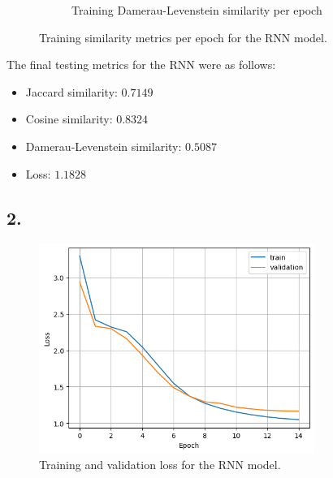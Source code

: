 \documentclass[11pt]{article}
\begin{document}
\begin{figure}[H]
\begin{subfigure}{.5\textwidth}
  \caption{Training Damerau-Levenstein similarity per epoch}
\end{subfigure}
\caption{Training similarity metrics per epoch for the RNN model.}
\label{fig:recurrent_similarity_per_epoch}
\end{figure}
The final testing metrics for the RNN were as follows:
\begin{itemize}
    \item Jaccard similarity: $0.7149$
    \item Cosine similarity: $0.8324$
    \item Damerau-Levenstein similarity: $0.5087$
    \item Loss: $1.1828$
\end{itemize}

\subsection{2.}
\begin{figure}[H]
    \centering
    \includegraphics[width=0.8\textwidth]{./plots/transformer_loss_per_epoch}
    \caption{Training and validation loss for the RNN model.}
    \label{fig:transformer_loss_per_epoch}
\end{figure}
\end{document}
